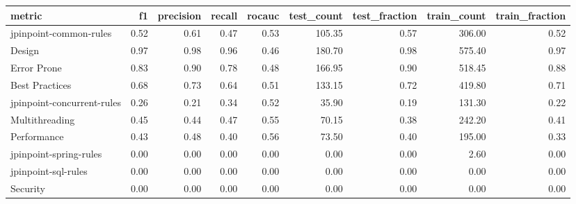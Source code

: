 \begin{tabular}{lrrrrrrrr}
\toprule
metric &   f1 &  precision &  recall &  rocauc &  test\_count &  test\_fraction &  train\_count &  train\_fraction \\
\midrule
jpinpoint-common-rules     & 0.52 &       0.61 &    0.47 &    0.53 &      105.35 &           0.57 &       306.00 &            0.52 \\
Design                     & 0.97 &       0.98 &    0.96 &    0.46 &      180.70 &           0.98 &       575.40 &            0.97 \\
Error Prone                & 0.83 &       0.90 &    0.78 &    0.48 &      166.95 &           0.90 &       518.45 &            0.88 \\
Best Practices             & 0.68 &       0.73 &    0.64 &    0.51 &      133.15 &           0.72 &       419.80 &            0.71 \\
jpinpoint-concurrent-rules & 0.26 &       0.21 &    0.34 &    0.52 &       35.90 &           0.19 &       131.30 &            0.22 \\
Multithreading             & 0.45 &       0.44 &    0.47 &    0.55 &       70.15 &           0.38 &       242.20 &            0.41 \\
Performance                & 0.43 &       0.48 &    0.40 &    0.56 &       73.50 &           0.40 &       195.00 &            0.33 \\
jpinpoint-spring-rules     & 0.00 &       0.00 &    0.00 &    0.00 &        0.00 &           0.00 &         2.60 &            0.00 \\
jpinpoint-sql-rules        & 0.00 &       0.00 &    0.00 &    0.00 &        0.00 &           0.00 &         0.00 &            0.00 \\
Security                   & 0.00 &       0.00 &    0.00 &    0.00 &        0.00 &           0.00 &         0.00 &            0.00 \\
\bottomrule
\end{tabular}
